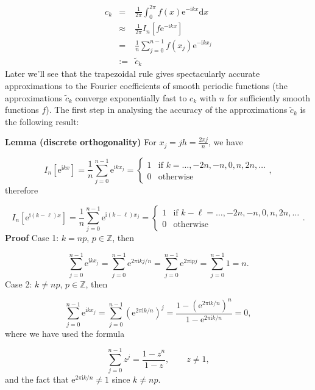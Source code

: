 \documentclass[12pt,a4paper]{article}
\begin{document}
\begin{eqnarray*}
c_k &=& \frac{1}{2\pi}\int_{0}^{2\pi} f(x) \mathrm{e}^{-\mathrm{i}k x} \mathrm{d} x \\
    &\approx & \frac{1}{2\pi}I_{n}\left[f\mathrm{e}^{-\mathrm{i}k x}\right]  \\
    &=& \frac{1}{n}\sum_{j = 0}^{n-1} f(x_j)\mathrm{e}^{-\mathrm{i}kx_j} \\
    &:=& \widetilde{c}_k
\end{eqnarray*}
Later we'll see that the trapezoidal rule gives spectacularly accurate approximations to the Fourier coefficients of smooth periodic functions (the approximations $\widetilde{c}_k$ converge exponentially fast to $c_k$ with $n$ for sufficiently smooth functions $f$).  The first step in analysing the accuracy of the approximations $\widetilde{c}_k$ is the following result:

\textbf{Lemma (discrete orthogonality)} For $x_j = jh = \frac{2\pi j}{n}$, we have

\[
I_n\left[\mathrm{e}^{\mathrm{i}kx}\right] = \frac{1}{n}\sum_{j = 0}^{n-1} \mathrm{e}^{\mathrm{i}kx_j} = \begin{cases}
1 & \text{if } k = \ldots, -2n, -n, 0, n, 2n, \ldots \\
0 & \text{otherwise}
\end{cases},
\]
therefore

\[
I_n\left[\mathrm{e}^{\mathrm{i}(k-\ell)x}\right] = \frac{1}{n}\sum_{j = 0}^{n-1} \mathrm{e}^{\mathrm{i}(k-\ell)x_j} = \begin{cases}
1 & \text{if } k-\ell = \ldots, -2n, -n, 0, n, 2n, \ldots \\
0 & \text{otherwise}
\end{cases}.
\]
\textbf{Proof} Case 1: $k = np$, $p \in \mathbb{Z}$, then

\[
\sum_{j = 0}^{n-1} \mathrm{e}^{\mathrm{i}kx_j} = \sum_{j = 0}^{n-1} \mathrm{e}^{2\pi\mathrm{i}kj/n} = \sum_{j = 0}^{n-1} \mathrm{e}^{2\pi\mathrm{i}pj} = \sum_{j = 0}^{n-1} 1 = n.
\]
Case 2: $k \neq np$, $p \in \mathbb{Z}$, then

\[
\sum_{j = 0}^{n-1} \mathrm{e}^{\mathrm{i}kx_j} = \sum_{j = 0}^{n-1} \left(\mathrm{e}^{2\pi\mathrm{i}k/n}\right)^{j} = \frac{1-\left(\mathrm{e}^{2\pi\mathrm{i}k/n}\right)^{n}}{1-\mathrm{e}^{2\pi\mathrm{i}k/n}} = 0,
\]
where we have used the formula

\[
\sum_{j = 0}^{n-1} z^{j} = \frac{1-z^n}{1-z},\qquad z \neq 1,
\]
and the fact that $\mathrm{e}^{2\pi\mathrm{i}k/n} \neq 1$ since $k \neq np$.
\end{document}
